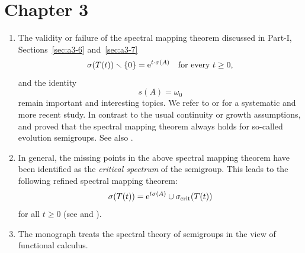 \section*{Chapter 3}
\begin{enumerate} 

\item
The validity or failure of the spectral mapping theorem discussed in Part-I, Sections~\ref{sec:a3-6} and~\ref{sec:a3-7} 
\[
\sigma(T(t)) \setminus \{0\} = \eu^{t \cdot \sigma(A)} \quad \text{for every $t \geq 0$,}
\]
and the identity 
\[
s(A) = \omega_{0}
\]
remain important and interesting topics.
We refer to \textcite[Section 2]{zbmath00921898} or \textcite[Chapter IV]{zbmath01354832} for a systematic and more recent study. 
In contrast to the usual continuity or growth assumptions, 
\textcite{zbmath00763985} and \textcite{zbmath00858476}
proved that the spectral mapping theorem always holds for so-called evolution semigroups.
See also \textcite[Chapter VI, Theorem 9.18]{zbmath01354832}.

\item 
In general, the missing points in the above spectral mapping theorem have been 
identified as the \emph{critical spectrum} of the semigroup. 
This leads to the 
following refined spectral mapping theorem:
\[
    \sigma(T(t)) = 
        \mathrm{e}^{t \sigma(A)} \cup \sigma_{\text{crit}}(T(t)) 
\]
for all $t \geq 0$ (see \textcite{zbmath01496433} and \textcite{zbmath01484683}).

\item
The monograph \textcite{zbmath05030449} treats the spectral theory of semigroups in the view of functional calculus.

\end{enumerate}
